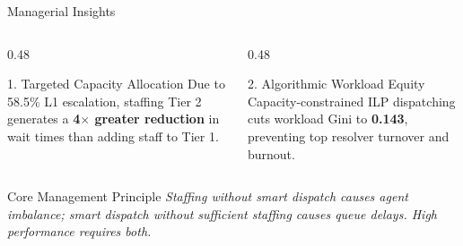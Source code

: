 \documentclass[10pt,aspectratio=169]{beamer}
\begin{document}
\begin{frame}{Managerial Insights}
    \vspace{0.2cm}
    \begin{columns}[T]
        \begin{column}{0.48\textwidth}
            \begin{block}{1. Targeted Capacity Allocation}
                \vspace{0.15cm}
                Due to 58.5\% L1 escalation, staffing Tier 2 generates a \textbf{4$\times$ greater reduction} in wait times than adding staff to Tier 1.
                \vspace{0.15cm}
            \end{block}
        \end{column}
        \begin{column}{0.48\textwidth}
            \begin{block}{2. Algorithmic Workload Equity}
                \vspace{0.15cm}
                Capacity-constrained ILP dispatching cuts workload Gini to \textbf{0.143}, preventing top resolver turnover and burnout.
                \vspace{0.15cm}
            \end{block}
        \end{column}
    \end{columns}
    \vspace{0.3cm}
    \begin{block}{Core Management Principle}
        \centering
        \textit{Staffing without smart dispatch causes agent imbalance; smart dispatch without sufficient staffing causes queue delays. High performance requires both.}
    \end{block}
\end{frame}
\end{document}
